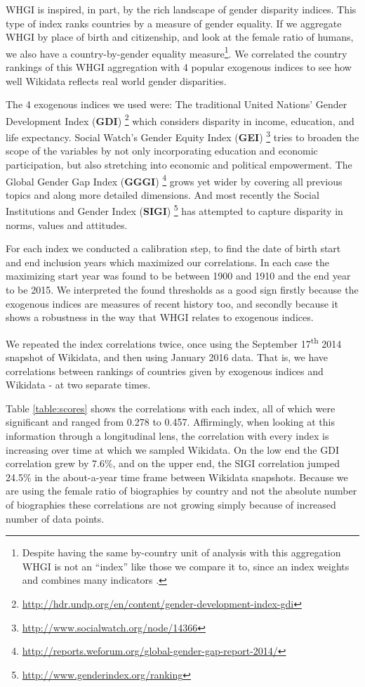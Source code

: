 \documentclass{sig-alternate-05-2015}
\begin{document}
WHGI is inspired, in part, by the rich landscape of gender disparity indices. This type of index ranks countries by a measure of gender equality. If we aggregate WHGI by place of birth and citizenship, and look at the female ratio of humans, we also have a country-by-gender equality measure\footnote{Despite having the same by-country unit of analysis with this aggregation WHGI is not an ``index'' like those we compare it to, since an index weights and combines many indicators \cite{rossi_handbook_1980}. }.  We correlated the country rankings of this WHGI aggregation with 4 popular exogenous indices to see how well Wikidata reflects real world gender disparities.

The 4 exogenous indices we used were: The traditional United Nations' Gender Development Index (\textbf{GDI})  \footnote{\url{http://hdr.undp.org/en/content/gender-development-index-gdi}} which considers disparity in income, education, and life expectancy. Social Watch's Gender Equity Index (\textbf{GEI}) \footnote{\url{http://www.socialwatch.org/node/14366}} tries to broaden the scope of the variables by not only incorporating education and economic participation, but also stretching into economic and political empowerment. The Global Gender Gap Index (\textbf{GGGI}) \footnote{\url{http://reports.weforum.org/global-gender-gap-report-2014/}} grows yet wider by covering all previous topics and along more detailed dimensions. And most recently  the Social Institutions and Gender Index (\textbf{SIGI}) \footnote{\url{http://www.genderindex.org/ranking}} has attempted to capture disparity in norms, values and attitudes.

For each index we conducted a calibration step, to find the date of birth start and end inclusion years which maximized our correlations. In each case the maximizing start year was found to be between 1900 and 1910 and the end year to be 2015. We interpreted the found thresholds as a good sign firstly because the exogenous indices are measures of recent history too, and secondly because it shows a robustness in the way that WHGI relates to exogenous indices.

We repeated the index correlations twice, once using the September 17\textsuperscript{th} 2014 snapshot of Wikidata, and then using January 2016 data. That is, we have correlations between rankings of countries given by exogenous indices and Wikidata - at two separate times.

Table \ref{table:scores} shows the correlations with each index, all of which were significant and ranged from 0.278 to 0.457. Affirmingly, when looking at this information through a longitudinal lens, the correlation with every index is increasing over time at which we sampled Wikidata. On the low end the GDI correlation grew by 7.6\%, and on the upper end, the SIGI correlation jumped 24.5\% in the about-a-year time frame between Wikidata snapshots. Because we are using the  female ratio of biographies by country and not the absolute number of biographies these correlations are not growing simply because of increased number of data points.
\end{document}
